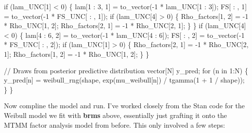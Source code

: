 \documentclass[
  letterpaper,
  DIV=11,
  numbers=noendperiod]{scrreprt}
\newenvironment{Shaded}{\begin{snugshade}}{\end{snugshade}}
\newcommand{\CommentTok}[1]{\textcolor[rgb]{0.37,0.37,0.37}{#1}}
\newcommand{\ControlFlowTok}[1]{\textcolor[rgb]{0.00,0.23,0.31}{#1}}
\newcommand{\DataTypeTok}[1]{\textcolor[rgb]{0.68,0.00,0.00}{#1}}
\newcommand{\DecValTok}[1]{\textcolor[rgb]{0.68,0.00,0.00}{#1}}
\newcommand{\NormalTok}[1]{\textcolor[rgb]{0.00,0.23,0.31}{#1}}
\begin{document}
\begin{Shaded}
\begin{Highlighting}[]
  \ControlFlowTok{if}\NormalTok{ (lam\_UNC[}\DecValTok{1}\NormalTok{] \textless{} }\DecValTok{0}\NormalTok{) \{}
\NormalTok{    lam[}\DecValTok{1}\NormalTok{ : }\DecValTok{3}\NormalTok{, }\DecValTok{1}\NormalTok{] = to\_vector({-}}\DecValTok{1}\NormalTok{ * lam\_UNC[}\DecValTok{1}\NormalTok{ : }\DecValTok{3}\NormalTok{]);}
\NormalTok{    FS[ : , }\DecValTok{1}\NormalTok{] = to\_vector({-}}\DecValTok{1}\NormalTok{ * FS\_UNC[ : , }\DecValTok{1}\NormalTok{]);}
    \ControlFlowTok{if}\NormalTok{ (lam\_UNC[}\DecValTok{4}\NormalTok{] \textgreater{} }\DecValTok{0}\NormalTok{) \{}
\NormalTok{      Rho\_factors[}\DecValTok{1}\NormalTok{, }\DecValTok{2}\NormalTok{] = {-}}\DecValTok{1}\NormalTok{ * Rho\_UNC[}\DecValTok{1}\NormalTok{, }\DecValTok{2}\NormalTok{];}
\NormalTok{      Rho\_factors[}\DecValTok{2}\NormalTok{, }\DecValTok{1}\NormalTok{] = {-}}\DecValTok{1}\NormalTok{ * Rho\_UNC[}\DecValTok{2}\NormalTok{, }\DecValTok{1}\NormalTok{];}
\NormalTok{    \}}
\NormalTok{  \}}
  \ControlFlowTok{if}\NormalTok{ (lam\_UNC[}\DecValTok{4}\NormalTok{] \textless{} }\DecValTok{0}\NormalTok{) \{}
\NormalTok{    lam[}\DecValTok{4}\NormalTok{ : }\DecValTok{6}\NormalTok{, }\DecValTok{2}\NormalTok{] = to\_vector({-}}\DecValTok{1}\NormalTok{ * lam\_UNC[}\DecValTok{4}\NormalTok{ : }\DecValTok{6}\NormalTok{]);}
\NormalTok{    FS[ : , }\DecValTok{2}\NormalTok{] = to\_vector({-}}\DecValTok{1}\NormalTok{ * FS\_UNC[ : , }\DecValTok{2}\NormalTok{]);}
    \ControlFlowTok{if}\NormalTok{ (lam\_UNC[}\DecValTok{1}\NormalTok{] \textgreater{} }\DecValTok{0}\NormalTok{) \{}
\NormalTok{      Rho\_factors[}\DecValTok{2}\NormalTok{, }\DecValTok{1}\NormalTok{] = {-}}\DecValTok{1}\NormalTok{ * Rho\_UNC[}\DecValTok{2}\NormalTok{, }\DecValTok{1}\NormalTok{];}
\NormalTok{      Rho\_factors[}\DecValTok{1}\NormalTok{, }\DecValTok{2}\NormalTok{] = {-}}\DecValTok{1}\NormalTok{ * Rho\_UNC[}\DecValTok{1}\NormalTok{, }\DecValTok{2}\NormalTok{];}
\NormalTok{    \}}
\NormalTok{  \}}

  \CommentTok{// Draws from posterior predictive distribution}
  \DataTypeTok{vector}\NormalTok{[N] y\_pred;}
  \ControlFlowTok{for}\NormalTok{ (n }\ControlFlowTok{in} \DecValTok{1}\NormalTok{:N) \{}
\NormalTok{    y\_pred[n] = weibull\_rng(shape, exp(mu\_weibull[n]) / tgamma(}\DecValTok{1}\NormalTok{ + }\DecValTok{1}\NormalTok{ / shape));}
\NormalTok{  \}}
\NormalTok{\}}
\end{Highlighting}
\end{Shaded}

Now compline the model and run. I've worked closely from the Stan code
for the Weibull model we fit with \textbf{brms} above, essentially just
grafting it onto the MTMM factor analysis model from before. This only
involved a few steps:
\end{document}
